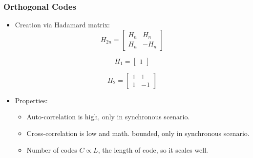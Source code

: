 \documentclass{beamer}
\begin{document}
	\begin{frame}\frametitle{Orthogonal Codes}
		\begin{itemize}

			\item Creation via Hadamard matrix: 
			\begin{equation*}
				H_{2n} = 
				\begin{bmatrix} 
					H_n & H_n \\ 
					H_n & -H_n 
				\end{bmatrix}
			\end{equation*}


			\noindent
			\begin{minipage}{.5\linewidth}
				\begin{equation*}
					H_{1} = 
					\begin{bmatrix} 
						1
					\end{bmatrix}
				\end{equation*}
			\end{minipage}%
			\begin{minipage}{.5\linewidth}
				\begin{equation*}
					H_{2} = 
					\begin{bmatrix} 
						1 & 1 \\ 
						1 & -1
					\end{bmatrix}
				\end{equation*}
			\end{minipage}

	
			\item Properties:
				\begin{itemize}



				\item Auto-correlation is high, only in synchronous scenario.

				\item Cross-correlation is low and math. bounded, only in synchronous scenario.

				\item Number of codes $C \propto L$, the length of code, so it scales well.

			\end{itemize}


		\end{itemize}
		

	\end{frame}
\end{document}
